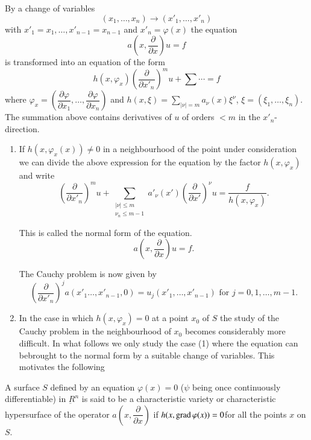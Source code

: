 By a change of variables
$$
(x_1,  \ldots,  x_n) \to (x'_1,  \ldots,  x'_n) 
$$
with $x'_1 = x_1, \ldots, x'_{n-1}=x_{n-1}$ and $x'_n = \varphi (x)$ the
equation 
\begin{equation}
a \left(x, \frac {\partial}{\partial x}\right) u = f
\tag{2.1}\label{addeq2.1}  
\end{equation}
is transformed into an equation of the form
$$
h(x,  \varphi_x) \left(\frac{\partial}{\partial x'_n}\right)^m u+\sum
\cdots = f  
$$\pageoriginale
where $\varphi_x = \left(\dfrac{\partial \varphi}{\partial x_1}, \ldots,
\dfrac{\partial \varphi}{\partial x_n}\right)$ and $h(x, \xi) =
\sum\limits_{|\nu|=m} a_\nu (x) \xi^\nu$, $\xi = (\xi_1, \ldots,
\xi_n)$. The 
summation above contains derivatives of $u$ of orders $< m$ in the
$x'_n$-direction. 
\begin{enumerate}
\renewcommand{\labelenumi}{(\theenumi)}
\item If $h(x,  \varphi_x (x) ) \neq 0$ in a neighbourhood of the
  point under consideration we can divide the above expression for the
  equation by the factor $h(x, \varphi_x)$ and write 
\begin{equation*}
\left(\frac{\partial}{\partial x'_n}\right)^{m} u + \sum_{\substack {|\nu|\leq m\\ 
{\nu_n \leq m-1}}} a'_\nu (x') 
  \left(\frac{\partial}{\partial x'}\right)^\nu
  u=\frac{f}{h(x,\varphi_x)}. \tag{2.2}\label{chap1-eq2.2}  
\end{equation*}

This is called the normal form of the equation.
$$
a\left(x,  \frac{\partial}{\partial x}\right) u = f.
$$

The Cauchy problem is now given by 
$$
\left(\frac{\partial}{\partial x'_n}\right)^j a(x'_1\ldots,  x'_{n-1},
0) =  u_j (x'_1, \ldots,  x'_{n-1}) \text{ for } j=0, 1, \ldots,  m-1.  
$$

\item In the case in which $h (x,  \varphi_x) = 0$ at a point $x_0$ of
  $S$ the study  of the Cauchy problem in the neighbourhood of $x_0$
  becomes considerably more difficult. In what follows we only study
  the case (1) where the equation can  bebrought to the normal form by
  a suitable change of variables. This motivates the following 
\end{enumerate}

\begin{defi*}
A surface $S$ defined by an equation $\varphi(x) = 0$ ($\psi$ being once
continuously differentiable) in $\underbar{R}^n$ is said to be a
characteristic variety or characteristic hypersurface of the operator
$a\left(x,  \dfrac{\partial}{\partial x}\right)$ if $h(x,  \operatorname{grad}  \varphi (x)) =
0$\pageoriginale for all the points $x$ on $S$. 
\end{defi*}

